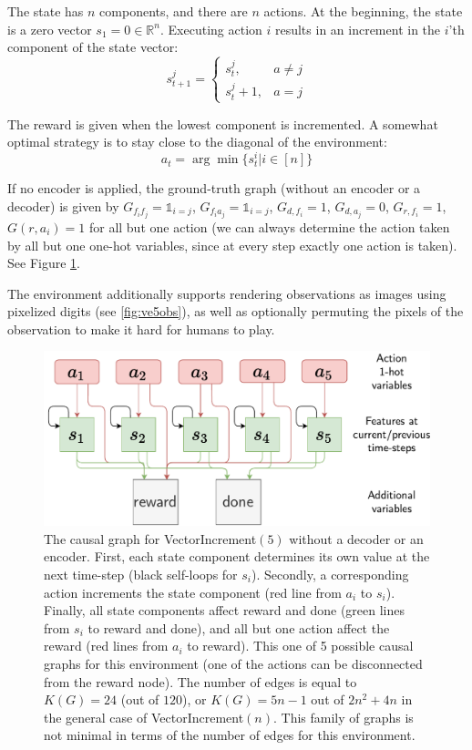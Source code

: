 \documentclass[a4paper,11pt,oneside]{report}
\begin{document}
The state has $n$ components, and there are $n$ actions. At the beginning, the state is a zero vector $s_1=0\in\mathbb R^n$. Executing action $i$ results in an increment in the $i$'th component of the state vector:
$$
s^j_{t+1}=\begin{cases}
s^j_t,&a\neq j\\
s^j_t+1,&a=j
\end{cases}
$$

The reward is given when the lowest component is incremented. A somewhat optimal strategy is to stay close to the diagonal of the environment:
$$
a_t=\arg\min \{s_t^i\big| i\in[n]\}
$$

If no encoder is applied, the ground-truth graph (without an encoder or a decoder) is given by $G_{f_if_j}=\mathds 1_{i=j}$, $G_{f_ia_j}=\mathds 1_{i=j}$, $G_{d,f_i}=1$, $G_{d,a_j}=0$, $G_{r,f_i}=1$, $G(r,a_i)=1$ for all but one action (we can always determine the action taken by all but one one-hot variables, since at every step exactly one action is taken). See Figure \ref{fig:ve5nodec}.

The environment additionally supports rendering observations as images using pixelized digits (see \autoref{fig:ve5obs}), as well as optionally permuting the pixels of the observation to make it hard for humans to play.

\begin{figure}[h]
    \centering
    \includegraphics[width=0.7\linewidth]{diagrams/ve5_nodec}
    \caption{The causal graph for VectorIncrement$(5)$ without a decoder or an encoder. First, each state component determines its own value at the next time-step (black self-loops for $s_i$). Secondly, a corresponding action increments the state component (red line from $a_i$ to $s_i$). Finally, all state components affect reward and done (green lines from $s_i$ to reward and done), and all but one action affect the reward (red lines from $a_i$ to reward). This one of 5 possible causal graphs for this environment (one of the actions can be disconnected from the reward node). The number of edges is equal to $K(G)=24$ (out of $120$), or $K(G)=5n-1$ out of $2n^2+4n$ in the general case of VectorIncrement$(n)$. This family of graphs is not minimal in terms of the number of edges for this environment.}
    \label{fig:ve5nodec}
\end{figure}
\end{document}
